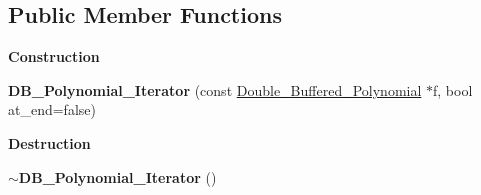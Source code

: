 \subsection*{Public Member Functions}
\begin{Indent}\textbf{ Construction}\par
\begin{DoxyCompactItemize}
\item 
\mbox{\label{class_d_b___polynomial___iterator_aa35fe56e92b8c5a866a4f503f3c9a587}} 
{\bfseries D\+B\+\_\+\+Polynomial\+\_\+\+Iterator} (const \hyperlink{class_double___buffered___polynomial}{Double\+\_\+\+Buffered\+\_\+\+Polynomial} $\ast$f, bool at\+\_\+end=false)
\end{DoxyCompactItemize}
\end{Indent}
\begin{Indent}\textbf{ Destruction}\par
\begin{DoxyCompactItemize}
\item 
\mbox{\label{class_d_b___polynomial___iterator_af8892a1128109ce22d4b6c57ce5e5398}} 
{\bfseries $\sim$\+D\+B\+\_\+\+Polynomial\+\_\+\+Iterator} ()
\end{DoxyCompactItemize}
\end{Indent}
